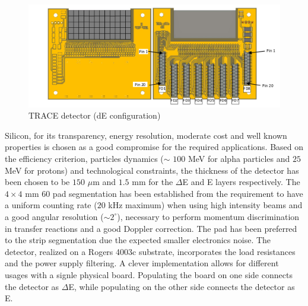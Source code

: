 \begin{figure}[h]
  \centering
  \includegraphics[scale=.65]{img/trace_de.png}
  \caption{TRACE detector (dE configuration)}
  \label{chain}
\end{figure}

\bigbreak

Silicon, for its transparency, energy resolution, moderate cost and
well known properties is chosen as a good compromise for the required
applications. Based on the efficiency criterion, particles dynamics ($\sim$
$100$ MeV for alpha particles and $25$ MeV for protons) and technological
constraints, the thickness of the detector has been chosen to be $150$ $\mu$m
and $1.5$ mm for the $\Delta$E and E layers respectively. The $4 \times 4$ mm
60 pad segmentation has been established from the requirement to have a uniform
counting rate ($20$ kHz maximum) when using high intensity beams and a good
angular resolution ($\sim 2^\circ$), necessary to perform momentum
discrimination in transfer reactions and a good Doppler correction. The pad
has been preferred to the strip segmentation due the expected smaller
electronics noise. The detector, realized on a Rogers 4003c substrate,
incorporates the load resistances and the power supply filtering. A clever
implementation allows for different usages with a signle physical board.
Populating the board on one side connects the detector as $\Delta$E, while
populating on the other side connects the detector as E.
